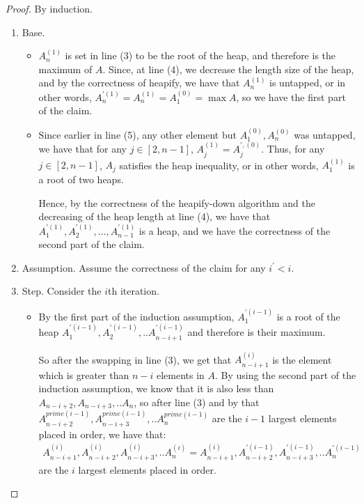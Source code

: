 \begin{proof}
By induction.
\begin{enumerate}
  \item Base. 
    \begin{itemize}
      \item $A^{(1)}_{n}$ is set in line (3) to be the root of the heap, and therefore is the maximum of $A$. Since, at line (4), we decrease the length size of the heap, and by the correctness of heapify, we have that $A^{(1)}_{n}$ is untapped, or in other words, $A^{\prime (1)}_{n} = A^{(1)}_{n} = A^{(0)}_{1} = \max A$, so we have the first part of the claim.

        \item Since earlier in line (5), any other element but $A^{(0)}_{1}, A^{(0)}_{n}$ was untapped, we have that for any $j \in [2,n-1]$, $A_{j}^{(1)} = A^{\prime, (0)}_{j}$. Thus, for any $j \in [2,n-1]$, $A_{j}$ satisfies the heap inequality, or in other words, $A^{(1)}_{1}$ is a root of two heaps.

        Hence, by the correctness of the heapify-down algorithm and the decreasing of the heap length at line (4), we have that $A^{\prime (1)}_{1}, A^{\prime (1)}_{2}, \ldots, A^{\prime (1)}_{n-1}$ is a heap, and we have the correctness of the second part of the claim.
    \end{itemize}

  \item Assumption. Assume the correctness of the claim for any $i^{\prime}<i$.
  \item Step. Consider the $i$th iteration. 

    \begin{itemize}
        \item By the first part of the induction assumption, $A^{\prime (i-1)}_{1}$ is a root of the heap $A^{\prime (i-1) }_{1},A^{\prime (i-1) }_{2},..A^{\prime (i-1) }_{n-i+1}$  and therefore is their maximum.

        So after the swapping in line (3), we get that $A^{(i)}_{n-i+1}$ is the element which is greater than $n-i$ elements in $A$. By using the second part of the induction assumption, we know that it is also less than $A_{n-i+2},A_{n-i+3},..A_{n}$, so after line (3) and by that 
        $A^{prime (i-1) }_{n-i+2},A^{prime (i-1) }_{n-i+3},..A^{prime (i-1) }_{n}$ are the $i-1$ largest elements placed in order,
        we have that:
        \begin{equation*}
          \begin{split}
            A^{(i) }_{n-i+1},A^{(i) }_{n-i+2},A^{(i) }_{n-i+3},..A^{(i) }_{n} = A^{(i) }_{n-i+1},A^{\prime (i-1) }_{n-i+2},A^{\prime (i-1) }_{n-i+3},..A^{ \prime (i-1) }_{n}
          \end{split}
        \end{equation*}
        are the $i$ largest elements placed in order. 


\end{itemize}
\end{enumerate}
\end{proof}
